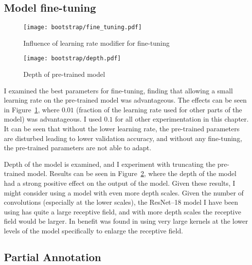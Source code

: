 \subsection{Model fine-tuning}

\begin{figure}[!ht]
\centering
  \centering
  \texttt{[image: bootstrap/fine\_tuning.pdf]}
  \caption{Influence of learning rate modifier for fine-tuning}  
  \label{fig:bootstrap_fine}
\end{figure}


\begin{figure}[!ht]
  \centering
  \texttt{[image: bootstrap/depth.pdf]}
  \caption{Depth of pre-trained model}  
  \label{fig:bootstrap_depth}
\end{figure}


I examined the best parameters for fine-tuning, finding that allowing a small learning rate on the pre-trained model was advantageous. The effects can be seen in Figure~\ref{fig:bootstrap_fine}, where $0.01$ (fraction of the learning rate used for other parts of the model) was advantageous. I used $ 0.1 $ for all other experimentation in this chapter. It can be seen that without the lower learning rate, the pre-trained parameters are disturbed leading to lower validation accuracy, and without any fine-tuning, the pre-trained parameters are not able to adapt.

Depth of the model is examined, and I experiment with truncating the pre-trained model. Results can be seen in Figure~\ref{fig:bootstrap_depth}, where the depth of the model had a strong positive effect on the output of the model. Given these results, I might consider using a model with even more depth scales. Given the number of convolutions (especially at the lower scales), the ResNet--18 model I have been using has quite a large receptive field, and with more depth scales the receptive field would be larger. In \cite{Peng2017} benefit was found in using very large kernels at the lower levels of the model specifically to enlarge the receptive field.






\subsection {Partial Annotation}



